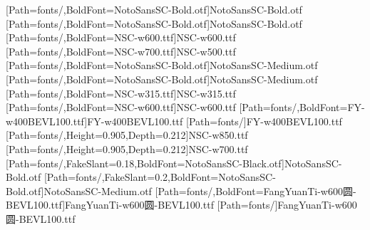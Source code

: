 [Path=fonts/,BoldFont=NotoSansSC-Bold.otf]{NotoSansSC-Bold.otf}
[Path=fonts/,BoldFont=NotoSansSC-Bold.otf]{NotoSansSC-Bold.otf}
[Path=fonts/,BoldFont=NSC-w600.ttf]{NSC-w600.ttf}
[Path=fonts/,BoldFont=NSC-w700.ttf]{NSC-w500.ttf}
[Path=fonts/,BoldFont=NotoSansSC-Bold.otf]{NotoSansSC-Medium.otf}
[Path=fonts/,BoldFont=NotoSansSC-Bold.otf]{NotoSansSC-Medium.otf}
[Path=fonts/,BoldFont=NSC-w315.ttf]{NSC-w315.ttf}
[Path=fonts/,BoldFont=NSC-w600.ttf]{NSC-w600.ttf}
[Path=fonts/,BoldFont=FY-w400BEVL100.ttf]{FY-w400BEVL100.ttf}
\newfontfamily{\libianlat}[Path=fonts/]{FY-w400BEVL100.ttf}
\newfontfamily{\numbold}[Path=fonts/,Height=0.905,Depth=0.212]{NSC-w850.ttf}
\newfontfamily{\numboldjian}[Path=fonts/,Height=0.905,Depth=0.212]{NSC-w700.ttf}
[Path=fonts/,FakeSlant=0.18,BoldFont=NotoSansSC-Black.otf]{NotoSansSC-Bold.otf}
[Path=fonts/,FakeSlant=0.2,BoldFont=NotoSansSC-Bold.otf]{NotoSansSC-Medium.otf}
[Path=fonts/,BoldFont=FangYuanTi-w600圆-BEVL100.ttf]{FangYuanTi-w600圆-BEVL100.ttf}
\newfontfamily{\lilat}[Path=fonts/]{FangYuanTi-w600圆-BEVL100.ttf}
